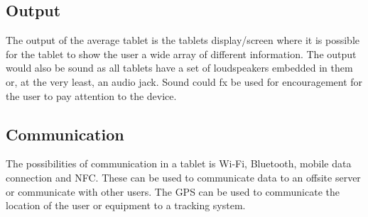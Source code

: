 \subsection{Output}
The output of the average tablet is the tablets display/screen where it is possible for the tablet to show the user a wide array of different information. The output would also be sound as all tablets have a set of loudspeakers embedded in them or, at the very least, an audio jack. Sound could fx be used for encouragement for the user to pay attention to the device. 

\subsection{Communication}
The possibilities of communication in a tablet is Wi-Fi, Bluetooth, mobile data connection and NFC. These can be used to communicate data to an offsite server or communicate with other users. The GPS can be used to communicate the location of the user or equipment to a tracking system.
